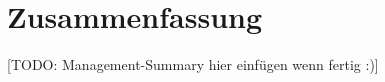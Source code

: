 \chapter{Zusammenfassung}
\label{chap:summary}


[TODO: Management-Summary hier einfügen wenn fertig :)]
